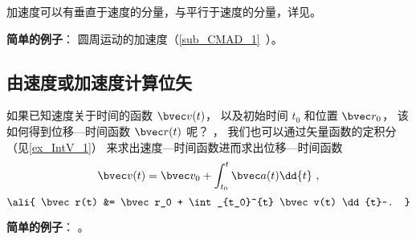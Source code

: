 加速度可以有垂直于速度的分量，与平行于速度的分量，详见。

\textbf{简单的例子}： 圆周运动的加速度（\autoref{sub_CMAD_1}~）。

\subsection{由速度或加速度计算位矢}

如果已知速度关于时间的函数 $\bvec v(t)$， 以及初始时间 $t_0$ 和位置 $\bvec r_0$， 该如何得到位移—时间函数 $\bvec r(t)$ 呢？ ， 我们也可以通过矢量函数的定积分（见\autoref{ex_IntV_1}） 来求出速度—时间函数进而求出位移—时间函数
\begin{equation}\label{eq_VnA_7}
\bvec v(t) = \bvec v_0 + \int_{t_0}^{t} \bvec a(t) \dd{t}~,
\end{equation}
\begin{equation}\label{eq_VnA_8}\ali{
\bvec r(t) &= \bvec r_0 + \int_{t_0}^{t} \bvec v(t) \dd{t}~.
}\end{equation}

\textbf{简单的例子}： 。
